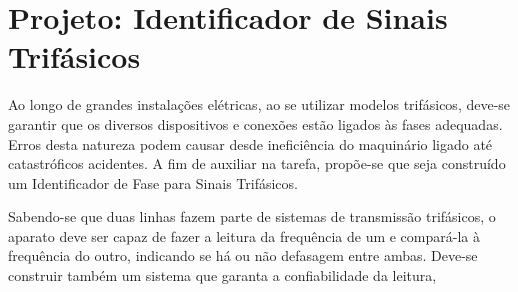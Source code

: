 \documentclass[12pt,a4paper,openany]{abntex2}
\begin{document}
\section{Projeto: Identificador de Sinais Trifásicos}

Ao longo de grandes instalações elétricas, ao se utilizar modelos trifásicos, deve-se garantir que os diversos dispositivos e conexões estão ligados às fases adequadas. Erros desta natureza podem causar desde ineficiência do maquinário ligado até catastróficos acidentes. A fim de auxiliar na tarefa, propõe-se que seja construído um Identificador de Fase para Sinais Trifásicos.

Sabendo-se que duas linhas fazem parte de sistemas de transmissão trifásicos, o aparato deve ser capaz de fazer a leitura da frequência de um e compará-la à frequência do outro, indicando se há ou não defasagem entre ambas. Deve-se construir também um sistema que garanta a confiabilidade da leitura, 




\end{document}
